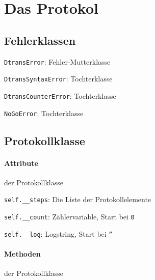 \section{Das Protokol}

\subsection{Fehlerklassen}

\begin{description}
  
\item \texttt{DtransError}: Fehler-Mutterklasse

\item \texttt{DtransSyntaxError}: Tochterklasse

\item \texttt{DtransCounterError}: Tochterklasse

\item \texttt{NoGoError}: Tochterklasse

\end{description}

\subsection{Protokollklasse}

\paragraph{Attribute} der Protokollklasse

\begin{description}
  
\item \texttt{self.\_\_steps}: Die Liste der Protokollelemente
  
\item \texttt{self.\_\_count}: Z\"ahlervariable, Start bei \texttt{0}
  
\item \texttt{self.\_\_log}: Logstring, Start bei \texttt{''}

\end{description}

\paragraph{Methoden} der Protokollklasse

